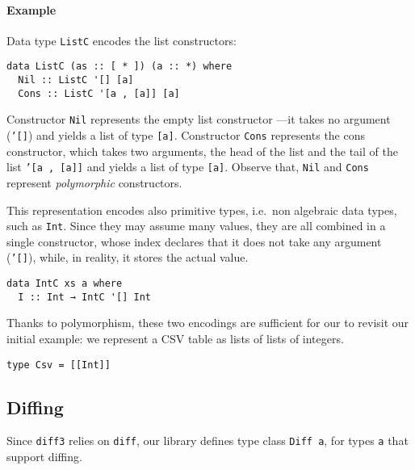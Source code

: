 \documentclass{sigplanconf}
\theoremstyle{plain}
\begin{document}
\paragraph{Example}
Data type \texttt{ListC} encodes the list constructors:
\begin{verbatim}
data ListC (as :: [ * ]) (a :: *) where
  Nil :: ListC '[] [a]
  Cons :: ListC '[a , [a]] [a]
\end{verbatim}
Constructor \texttt{Nil} represents the empty list constructor ---it
takes no argument (\texttt{'[]}) and yields a list of type
\texttt{[a]}.
Constructor \texttt{Cons} represents the cons constructor, which
takes two arguments, the head of the list and the tail of the list
\texttt{'[a , [a]]} and yields a list of type \texttt{[a]}.
%
Observe that, \texttt{Nil} and \texttt{Cons} represent \emph{polymorphic}
constructors.
%

%
This representation encodes also primitive types, i.e.\ non algebraic
data types, such as \texttt{Int}.
%
Since they may assume many values, they are all combined in a single
constructor, whose index declares that it does not take any argument
(\texttt{'[]}), while, in reality, it stores the actual value.
\begin{verbatim}
data IntC xs a where
  I :: Int → IntC '[] Int
\end{verbatim}
Thanks to polymorphism, these two encodings are sufficient for our to
revisit our initial example: we represent a CSV table as lists of
lists of integers.
\begin{verbatim}
type Csv = [[Int]]
\end{verbatim} 

\subsection{Diffing}
Since \texttt{diff3} relies on \texttt{diff}, our library defines type
class \texttt{Diff a}, for types \texttt{a} that support diffing.
\end{document}
